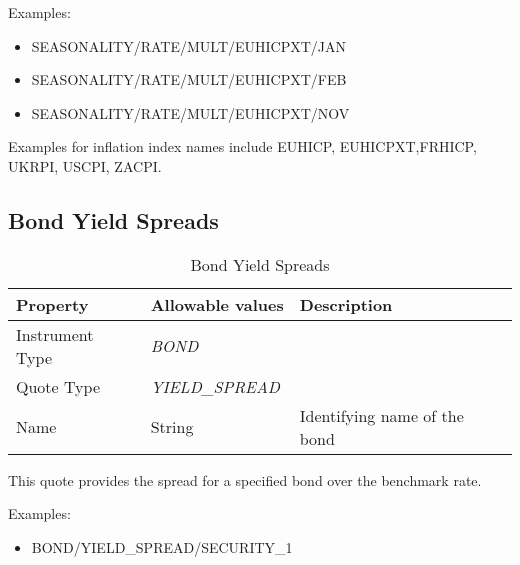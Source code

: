 \medskip
Examples:
\begin{itemize}
\item SEASONALITY/RATE/MULT/EUHICPXT/JAN
\item SEASONALITY/RATE/MULT/EUHICPXT/FEB
\item SEASONALITY/RATE/MULT/EUHICPXT/NOV
\end{itemize}

Examples for inflation index names include EUHICP, EUHICPXT,FRHICP, UKRPI, USCPI, ZACPI.

\subsection{Bond Yield Spreads}

\begin{table}[H]
\centering
  \begin{tabular}{|p{3cm}|p{3.5cm}|p{7cm}|}
  \hline
  {\bf Property} & {\bf Allowable values} & {\bf Description} \\ \hline
    Instrument Type & \emph{BOND} & \\ \hline
    Quote Type & \emph{YIELD\_SPREAD} & \\ \hline
    Name & String & Identifying name of the bond \\ \hline
  \end{tabular}
  \caption{Bond Yield Spreads}
  \label{tab:bondyieldspread_quote}
\end{table}

This quote provides the spread for a specified bond over the benchmark rate.

\medskip
Examples:
\begin{itemize}
	\item BOND/YIELD\_SPREAD/SECURITY\_1
\end{itemize}


